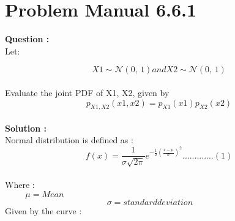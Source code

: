 \documentclass{article}
\begin{document}

\section{Problem Manual 6.6.1}
\textbf{Question :} \\
Let:

  $$X1 \sim \mathcal{N}(0,\,1) and X2 \sim \mathcal{N}(0,\,1)$$
 \\
Evaluate the joint PDF of X1, X2, given by \\
$$p_{X1,X2}(x1,x2) = p_{X1}(x1)p_{X2}(x2)$$ \\
\textbf{Solution :} \\
Normal distribution is defined as : \\
 $$f(x)={\frac {1}{\sigma {\sqrt {2\pi }}}}e^{-{\frac {1}{2}}\left({\frac {x-\mu }{\sigma }}\right)^{2}}.............(1)$$ \\
 

Where :\\
$\hspace{1cm} \mu = Mean$\\
$\hspace{5cm} \sigma = standard deviation$ \\
Given by the curve :\\
\end{document}
